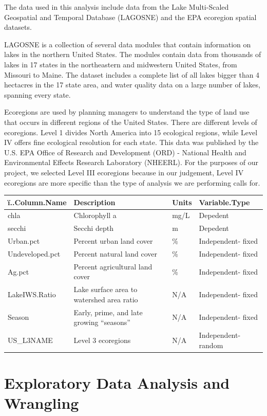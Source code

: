 \documentclass[12pt,]{article}
\begin{document}
The data used in this analysis include data from the Lake Multi-Scaled
Geospatial and Temporal Database (LAGOSNE) and the EPA ecoregion spatial
datasets.

LAGOSNE is a collection of several data modules that contain information
on lakes in the northern United States. The modules contain data from
thousands of lakes in 17 states in the northeastern and midwestern
United States, from Missouri to Maine. The dataset includes a complete
list of all lakes bigger than 4 hectacres in the 17 state area, and
water quality data on a large number of lakes, spanning every state.

Ecoregions are used by planning managers to understand the type of land
use that occurs in different regions of the United States. There are
different levels of ecoregions. Level 1 divides North America into 15
ecological regions, while Level IV offers fine ecological resolution for
each state. This data was published by the U.S. EPA Office of Research
and Development (ORD) - National Health and Environmental Effects
Research Laboratory (NHEERL). For the purposes of our project, we
selected Level III ecoregions because in our judgement, Level IV
ecoregions are more specific than the type of analysis we are performing
calls for.

\begin{longtable}[]{@{}llll@{}}
\toprule
ï..Column.Name & Description & Units & Variable.Type\tabularnewline
\midrule
\endhead
chla & Chlorophyll a & mg/L & Depedent\tabularnewline
secchi & Secchi depth & m & Depedent\tabularnewline
Urban.pct & Percent urban land cover & \% & Independent-
fixed\tabularnewline
Undeveloped.pct & Percent natural land cover & \% & Independent-
fixed\tabularnewline
Ag.pct & Percent agricultural land cover & \% & Independent-
fixed\tabularnewline
LakeIWS.Ratio & Lake surface area to watershed area ratio & N/A &
Independent- fixed\tabularnewline
Season & Early, prime, and late growing ``seasons'' & N/A & Independent-
fixed\tabularnewline
US\_L3NAME & Level 3 ecoregions & N/A & Independent-
random\tabularnewline
\bottomrule
\end{longtable}

\newpage

\hypertarget{exploratory-data-analysis-and-wrangling}{%
\section{Exploratory Data Analysis and
Wrangling}\label{exploratory-data-analysis-and-wrangling}}
\end{document}
